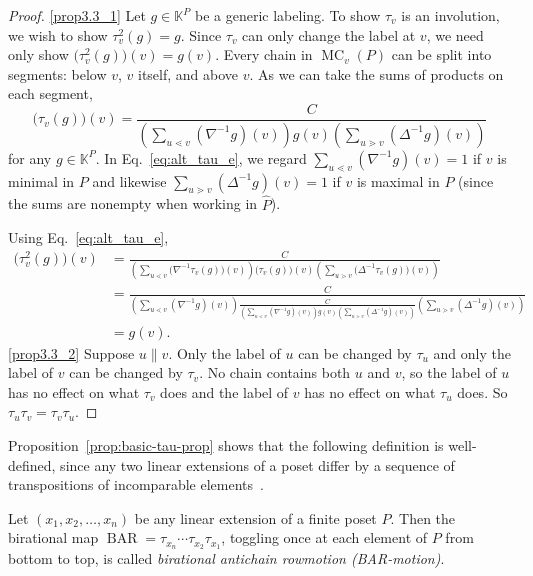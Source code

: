 \documentclass[ALCO,ThmDefs,Unicode,epreuves]{cedram}
\newcommand{\defn}[1]{\emph{#1}}
\newcommand{\kk}{\mathbb{K}}
\newcommand{\down}{\nabla}
\newcommand{\up}{\Delta}
\DeclareMathOperator{\mc}{MC}
\DeclareMathOperator{\BAR}{BAR}
\begin{document}
\begin{proof}
\ref{prop3.3_1}
Let $g\in \kk^P$ be a generic labeling.
To show $\tau_v$ is an involution, we wish to show
$\tau_v^2(g)=g$.
Since $\tau_v$ can only change the label at $v$, we need only show
$\big(\tau_v^2(g)\big)(v)=g(v)$.
Every chain in $\mc_v(P)$ can be split into segments: below $v$, $v$ itself, and above $v$. As we can take the sums of products on each segment,
\begin{equation}\label{eq:alt_tau_e}
\big(\tau_v(g)\big)(v) =
\frac{C}{\left(\sum\limits_{u\lessdot v}
(\down^{-1}g)(v)\right) g(v) \left(\sum\limits_{u\gtrdot v}
(\up^{-1}g)(v)\right)}
\end{equation}
for any $g\in\kk^P$.
In Eq.~\eqref{eq:alt_tau_e}, we regard
$\sum\limits_{u\lessdot v}
(\down^{-1}g)(v)=1$ if $v$ is minimal in $P$ and likewise $\sum\limits_{u\gtrdot v}
(\up^{-1}g)(v)=1$ if $v$ is maximal in $P$
(since the sums are nonempty when working in $\widehat{P}$).

Using Eq.~\eqref{eq:alt_tau_e},
\begin{align*}
 \big(\tau_v^2(g)\big)(v) &=
 \frac{C}{\left(\sum\limits_{u\lessdot v}
\big(\down^{-1}\tau_v(g)\big)(v)\right) \big(\tau_v(g)\big)(v) \left(\sum\limits_{u\gtrdot v}
\big(\up^{-1}\tau_v(g)\big)(v)\right)}\\
&=\frac{C}{\left(\sum\limits_{u\lessdot v}
(\down^{-1}g)(v)\right) \frac{C}{\left(\sum\limits_{u\lessdot v}
(\down^{-1}g)(v)\right) g(v) \left(\sum\limits_{u\gtrdot v}
(\up^{-1}g)(v)\right)} \left(\sum\limits_{u\gtrdot v}
(\up^{-1}g)(v)\right)}\\
&=g(v).
\end{align*}
\ref{prop3.3_2} %
Suppose $u \parallel v$.
Only the label of $u$ can be changed by $\tau_u$ and only the label of $v$ can be changed by $\tau_v$.
No chain contains both $u$ and $v$, so the label of $u$ has no effect on what $\tau_v$ does and the label of $v$ has no effect on what $\tau_u$ does. So $\tau_u\tau_v=\tau_v\tau_u$.
\end{proof}

Proposition~\ref{prop:basic-tau-prop}
shows that the following definition is
well-defined, since any two linear extensions of a
poset differ by a sequence of transpositions of incomparable elements~\cite{etienne-84}.

\begin{defi}\label{def:BAR}
Let $(x_1,x_2,\dots,x_n)$ be any linear extension of a finite poset $P$. Then the birational
map $\BAR=\tau_{x_n}\cdots \tau_{x_2} \tau_{x_1}$, \ie toggling once at each element of $P$
from bottom to top, is called \defn{birational antichain rowmotion (BAR-motion)}.
\end{defi}
\end{document}
